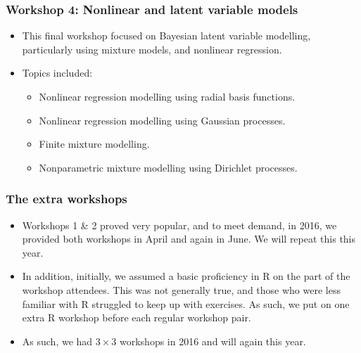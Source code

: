 \begin{frame}
	\frametitle{Workshop 4: Nonlinear and latent variable models}

	\begin{itemize}
		\item This final workshop focused on Bayesian latent variable modelling, particularly using mixture models, and nonlinear regression.
		\item Topics included:
			\begin{itemize}
				\item Nonlinear regression modelling using radial basis functions. 
				\item Nonlinear regression modelling using Gaussian processes.
				\item Finite mixture modelling.
				\item Nonparametric mixture modelling using Dirichlet processes. 
			\end{itemize}


	\end{itemize}

\end{frame}

\begin{frame}
	\frametitle{The extra workshops}

	\begin{itemize}
		\item Workshops 1 \& 2 proved very popular, and to meet demand, in 2016, we provided both workshops in April and again in June. We will repeat this this year.
		\item In addition, initially, we assumed a basic proficiency in R on the part of the workshop attendees. This was not generally true, and those who were less familiar with R struggled to keep up with exercises. As such, we put on one extra R workshop before each regular workshop pair.
		\item As such, we had $3 \times 3$ workshops in 2016 and will again this year.
	\end{itemize}

\end{frame}
